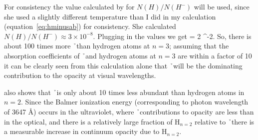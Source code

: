 \eeq
For consistency the value calculated by \cite{boehm1989} for
$N(H)/N(H^-)$ will be used, since she used a slightly different temperature than I did in my calculation (equation~\ref{eq:hminusab}) for consistency.  She calculated $N(H)/N(H^-) \approx 3 \times 10^{-8}$.  Plugging in the values we get
\beq
{} \approxeq {} = 2 ^{-2}.
\eeq
So, there is about 100 times more \h\ than hydrogen atoms at $n=3$;
assuming that the absorption coefficients of \h\ and  hydrogen atoms
at $n=3$ are within a factor of 10 it can be clearly seen from this
calculation alone that \h\ will be the dominating contribution to the
opacity at visual wavelengths.

\cite{boehm1989} also shows that \h\ is only about 10 times less abundant than hydrogen atoms in $n=2$.  Since the Balmer ionization energy (corresponding to photon wavelength of 3647 \AA) occurs in the ultraviolet, where \h\ contributions to opacity are less than in the optical, and there is a relatively large fraction of H$_{n=2}$ relative to \h\ there is a measurable increase in continuum opacity due to H$_{n=2}$.  %

